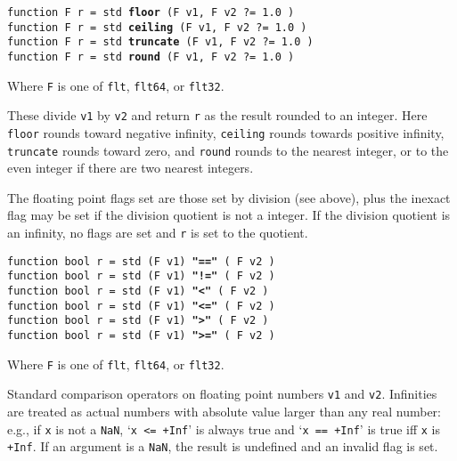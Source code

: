 \documentclass[12pt]{article}
\newcommand{\ttkey}[1]{{\tt \bfseries #1}}
\newenvironment{indpar}[1][0.3in]%
	{\begin{list}{}%
		     {\setlength{\itemsep}{0in}%
		      \setlength{\topsep}{0in}%
		      \setlength{\parsep}{1ex}%
		      \setlength{\labelwidth}{#1}%
		      \setlength{\leftmargin}{#1}%
		      \addtolength{\leftmargin}{\labelsep}}%
	 \item}%
	{\end{list}}
\begin{document}
{\tt function F r = std \ttkey{floor} (F v1, F v2 ?=~1.0 )} \\
{\tt function F r = std \ttkey{ceiling} (F v1, F v2 ?=~1.0 )} \\
{\tt function F r = std \ttkey{truncate} (F v1, F v2 ?=~1.0 )} \\
{\tt function F r = std \ttkey{round} (F v1, F v2 ?=~1.0 )}
\begin{indpar}
Where {\tt F} is one of {\tt flt}, {\tt flt64}, or {\tt flt32}.

These divide {\tt v1} by {\tt v2} and return {\tt r} as the
result rounded to an integer.
Here {\tt floor} rounds toward negative infinity, {\tt ceiling}
rounds towards positive infinity, {\tt truncate} rounds toward
zero, and {\tt round} rounds to the nearest integer, or to the
even integer if there are two nearest integers.

The floating point flags set are those set by division (see above), plus the
inexact flag may be set if the division quotient is not a integer.
If the division quotient is an infinity, no flags are set and {\tt r}
is set to the quotient.
\end{indpar}

{\tt function bool r = std (F v1) \ttkey{"=="} ( F v2 )} \\
{\tt function bool r = std (F v1) \ttkey{"!="} ( F v2 )} \\
{\tt function bool r = std (F v1) \ttkey{"<"} ( F v2 )} \\
{\tt function bool r = std (F v1) \ttkey{"<="} ( F v2 )} \\
{\tt function bool r = std (F v1) \ttkey{">"} ( F v2 )} \\
{\tt function bool r = std (F v1) \ttkey{">="} ( F v2 )}
\begin{indpar}
Where {\tt F} is one of {\tt flt}, {\tt flt64}, or {\tt flt32}.

Standard comparison operators on floating point numbers {\tt v1} and {\tt v2}.
Infinities are treated as actual numbers with absolute value
larger than any real number: e.g., if {\tt x} is not a {\tt NaN},
`{\tt x <= +Inf}' is always
true and `{\tt x == +Inf}' is true iff {\tt x} is {\tt +Inf}.
If an argument is a {\tt NaN}, the result is undefined and an invalid
flag is set.
\end{indpar}
\end{document}
